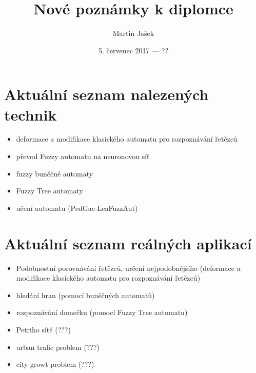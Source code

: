 \documentclass[a4paper,10pt]{article}
\title{Nové poznámky k diplomce}
\author{Martin Jašek}
\date{5. červenec 2017 --- ??}
\begin{document}
\maketitle
\tableofcontents
\newpage

\section{Aktuální seznam nalezených technik}

\begin{itemize}
 \item deformace a modifikace klasického automatu pro rozpoznávání řetězců
 \item převod Fuzzy automatu na neuronovou síť
 \item fuzzy buněčné automaty
 \item Fuzzy Tree automaty
 \item učení automatu (PedGac-LeaFuzzAut)
\end{itemize}

\section{Aktuální seznam reálných aplikací}
\begin{itemize}
 \item Podobnostní porovnávání řetězců, určení nejpodobnějšího (deformace a modifikace klasického automatu pro rozpoznávání řetězců)
 \item hledání hran (pomocí buněčných automatů)
 \item rozpoznávání domečku (pomocí Fuzzy Tree automatu)
 \item Petriho sítě (???)
 \item urban trafic problem (???)
 \item city growt problem (???)
\end{itemize}
\end{document}
